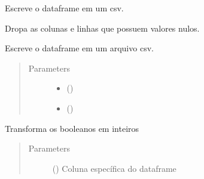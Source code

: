 \documentclass[letterpaper,10pt,brazil]{sphinxmanual}
\begin{document}
\begin{fulllineitems}
\begin{fulllineitems}
\label{\detokenize{classe_RS_limp:classe_RS_limp.RS_limp.escrever_csv}}
Escreve o dataframe em um csv.

\end{fulllineitems}


\begin{fulllineitems}
\label{\detokenize{classe_RS_limp:id0}}
Dropa as colunas e linhas que possuem valores nulos.

\end{fulllineitems}


\begin{fulllineitems}
\label{\detokenize{classe_RS_limp:id1}}
Escreve o dataframe em um arquivo csv.
\begin{quote}\begin{description}
\item[{Parameters}] \leavevmode\begin{itemize}
\item {} 
 () \textendash{} 

\item {} 
 () \textendash{} 

\end{itemize}

\end{description}\end{quote}

\end{fulllineitems}


\begin{fulllineitems}
\label{\detokenize{classe_RS_limp:id2}}
Transforma os booleanos em inteiros
\begin{quote}\begin{description}
\item[{Parameters}] \leavevmode
{} () \textendash{} Coluna específica do dataframe


\end{description}
\end{quote}
\end{fulllineitems}
\end{fulllineitems}
\end{document}
